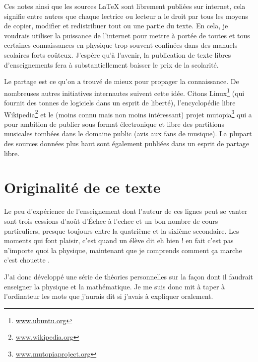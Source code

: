 \documentclass[a4paper,12pt]{book}
\theoremstyle{mes_exemples}	\newtheorem{exemple}[numtho]{Exemple}
\theoremstyle{mes_tho}
\begin{document}
Ces notes ainsi que les sources \LaTeX{} sont librement publiées sur internet, cela signifie entre autres que chaque lectrice ou lecteur a le droit par tous les moyens de copier, modifier et redistribuer tout ou une partie du texte. En cela, je voudrais utiliser la puissance de l'internet pour mettre à portée de toutes et tous certaines connaissances en physique trop souvent confinées dans des manuels scolaires forts coûteux. J'espère qu'à l'avenir, la publication de texte libres d'enseignements fera à substantiellement baisser le prix de la scolarité.

Le partage est ce qu'on a trouvé de mieux pour propager la connaissance. De nombreuses autres initiatives internautes suivent cette idée. Citons Linux\footnote{\href{www.ubuntu.org}{www.ubuntu.org}} (qui fournit des tonnes de logiciels dans un esprit de liberté), l'encyclopédie libre Wikipedia\footnote{\href{www.wikipedia.org}{www.wikipedia.org}} et le (moins connu mais non moins intéressant) projet mutopia\footnote{\href{www.mutopiaproject.org}{www.mutopiaproject.org}} qui a pour ambition de publier sous format électronique et libre des partitions musicales tombées dans le domaine public (avis aux fans de musique). La plupart des sources données plus haut sont également publiées dans un esprit de partage libre.


					\section{Originalité de ce texte}

Le peu d'expérience de l'enseignement dont l'auteur de ces lignes peut se vanter sont trois cessions d'août d'Échec à l'echec et un bon nombre de cours particuliers, presque toujours entre la quatrième et la sixième secondaire. Les moments qui font plaisir, c'est quand un élève dit \og eh bien ! en fait c'est pas n'importe quoi la physique, maintenant que je comprends comment ça marche c'est chouette \fg.
   
J'ai donc développé une série de théories personnelles sur la façon dont il faudrait enseigner la physique et la mathématique. Je me suis donc mit à taper à l'ordinateur les mots que j'aurais dit si j'avais à expliquer oralement.
\end{document}
